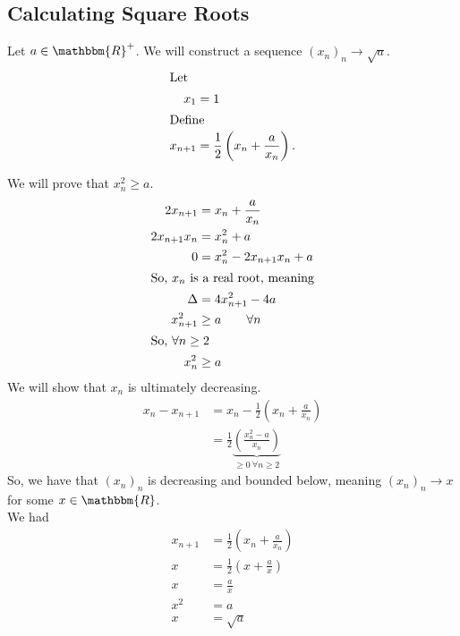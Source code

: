 \documentclass[10pt]{extarticle}
\newcommand{\R}{\mathbbm{R}}
\begin{document}
  \subsection{Calculating Square Roots}%
    Let $a\in\R^+$. We will construct a sequence $\left(x_n\right)_n \rightarrow \sqrt{a}$.
    \begin{align*}
      \shortintertext{Let}
      x_{1} &= 1\\
      \shortintertext{Define}
      x_{n+1} &= \frac{1}{2}\left(x_{n} + \frac{a}{x_n}\right).
    \end{align*}

    We will prove that $x_{n}^2 \geq a$.
    \begin{align*}
      2x_{n+1} &= x_{n} + \frac{a}{x_n}\\
      2x_{n+1}x_n &= x_{n}^2 + a\\
      0 &= x_{n}^2 - 2x_{n+1}x_{n} + a\\
      \shortintertext{So, $x_{n}$ is a real root, meaning}
      \Delta &= 4x_{n+1}^2 - 4a\\
      x_{n+1}^2 &\geq a \tag*{$\forall n$}\\
      \shortintertext{So, $\forall n\geq 2$}
      x_{n}^2 &\geq a
    \end{align*}
    We will show that $x_n$ is ultimately decreasing.
    \begin{align*}
      x_n - x_{n+1} &= x_{n} - \frac{1}{2}\left(x_n + \frac{a}{x_n}\right)\\
                    &= \frac{1}{2}\underbrace{\left(\frac{x_n^2 - a}{x_n}\right)}_{\geq 0~\forall n\geq 2}
    \end{align*}
    So, we have that $\left(x_n\right)_n$ is decreasing and bounded below, meaning $(x_n)_n \rightarrow x$ for some $x\in\R$.\\

    We had
    \begin{align*}
      x_{n+1} &= \frac{1}{2}\left(x_n + \frac{a}{x_n}\right)\\
      x &= \frac{1}{2}\left(x + \frac{a}{x}\right)\\
      x &= \frac{a}{x}\\
      x^2 &= a\\
      x &= \sqrt{a} \tag*{remember that $x > 0$}
    \end{align*}
\end{document}
